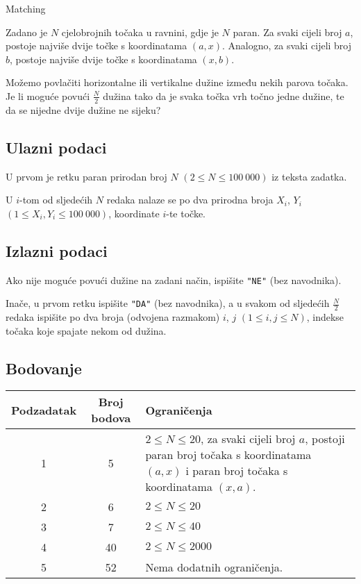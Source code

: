 \begin{statement}[
  problempoints=110,
  timelimit=2.5 sekunde,
  memorylimit=512 MiB,
]{Matching}

Zadano je $N$ cjelobrojnih točaka u ravnini, gdje je $N$ paran.  Za svaki
cijeli broj $a$, postoje najviše dvije točke s koordinatama $(a, x)$.
Analogno, za svaki cijeli broj $b$, postoje najviše dvije točke s
koordinatama $(x, b)$.

Možemo povlačiti horizontalne ili vertikalne dužine između nekih parova točaka.
Je li moguće povući $\frac{N}{2}$ dužina tako da je svaka točka vrh točno
jedne dužine, te da se nijedne dvije dužine ne sijeku?

\subsection*{Ulazni podaci}
U prvom je retku paran prirodan broj $N$ $(2 \le N \le 100\ 000)$ iz teksta
zadatka.

U $i$-tom od sljedećih $N$ redaka nalaze se po dva prirodna broja $X_i$, $Y_i$
$(1 \le X_i, Y_i \le 100\ 000)$, koordinate $i$-te točke.

\subsection*{Izlazni podaci}
Ako nije moguće povući dužine na zadani način, ispišite \texttt{"NE"} (bez
navodnika).

Inače, u prvom retku ispišite \texttt{"DA"} (bez navodnika), a u svakom od
sljedećih $\frac{N}{2}$ redaka ispišite po dva broja (odvojena razmakom) $i$,
$j$ $(1 \le i, j \le N)$, indekse točaka koje spajate nekom od dužina.

 \subsection*{Bodovanje}
{\renewcommand{\arraystretch}{1.4}
  \setlength{\tabcolsep}{6pt}
  \begin{tabular}{ccl}
 Podzadatak & Broj bodova & Ograničenja \\ \midrule
    1 & 5 &   \makecell[l]{$2 \le N \le 20$, za svaki cijeli broj $a$, postoji paran
              broj točaka s koordinatama $(a, x)$ \\ i paran broj točaka s koordinatama
              $(x, a)$. } \\
  2 & 6 & $2 \le N \le 20$ \\
  3 & 7 & $2 \le N \le 40$ \\
  4 & 40 & $2 \le N \le 2000$ \\
  5 & 52 & Nema dodatnih ograničenja.
\end{tabular}}


\end{statement}

